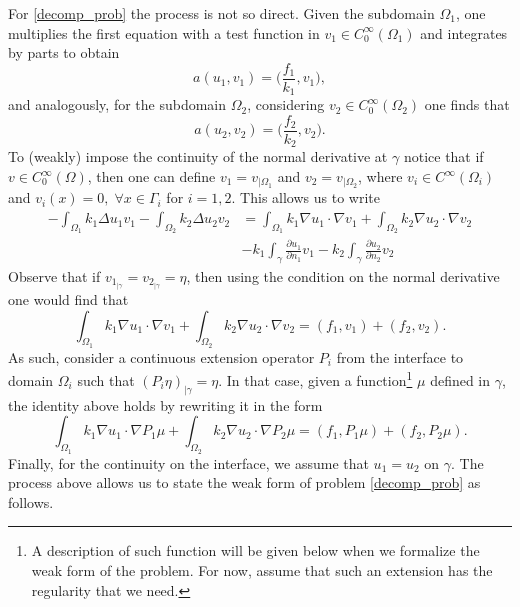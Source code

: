 For \eqref{decomp_prob} the process is not so direct. Given the subdomain \(\Omega_1\), one multiplies the first equation with a test function in \(v_1 \in C^\infty_0(\Omega_1)\) and integrates by parts to obtain
\[
a(u_1,v_1) = \Big(\frac{f_1}{k_1}, v_1\Big),    
\]
and analogously, for the subdomain \(\Omega_2\), considering \(v_2 \in C^\infty_0(\Omega_2)\) one finds that
\[
a(u_2,v_2) = \Big(\frac{f_2}{k_2}, v_2\Big).        
\]
To (weakly) impose the continuity of the normal derivative at \(\gamma\) notice that if \(v \in C^\infty_0(\Omega)\), then one can define \(v_1 = v_{|\Omega_1}\) and \(v_2 = v_{|\Omega_2}\), where \(v_i \in C^\infty(\Omega_i)\) and \(v_i(x)=0, \; \forall x \in \Gamma_i\) for \(i=1, 2\). This allows us to write
\begin{align*}
    -\int_{\Omega_1} k_1 \Delta u_1 v_1 -\int_{\Omega_2} k_2 \Delta u_2 v_2 &= \int_{\Omega_1} k_1\nabla u_1 \cdot \nabla v_1 + \int_{\Omega_2} k_2\nabla u_2 \cdot \nabla v_2\\
    &- k_1 \int_\gamma \frac{\partial u_1}{\partial n_1}v_1 - k_2 \int_\gamma \frac{\partial u_2}{\partial n_2}v_2
\end{align*}
Observe that if \(v_{1_{|\gamma}} = v_{2_{|\gamma}} = \eta\), then using the condition on the normal derivative one would find that 
\[
\int_{\Omega_1} k_1\nabla u_1 \cdot \nabla v_1 + \int_{\Omega_2} k_2\nabla u_2 \cdot \nabla v_2 = (f_1, v_1) + (f_2, v_2).
\]
As such, consider a continuous extension operator \(P_i\) from the interface to domain \(\Omega_i\) such that \((P_i \eta)_{|\gamma} = \eta\). In that case, given a function\footnote{A description of such function will be given below when we formalize the weak form of the problem. For now, assume that such an extension has the regularity that we need.} \(\mu\) defined in \(\gamma\), the identity above holds by rewriting it in the form
\[
\int_{\Omega_1} k_1\nabla u_1 \cdot \nabla P_1 \mu + \int_{\Omega_2} k_2\nabla u_2 \cdot \nabla P_2 \mu = (f_1, P_1 \mu) + (f_2, P_2 \mu).  
\]
Finally, for the continuity on the interface, we assume that \(u_1 = u_2\) on \(\gamma\). The process above allows us to state the weak form of problem \eqref{decomp_prob} as follows.
